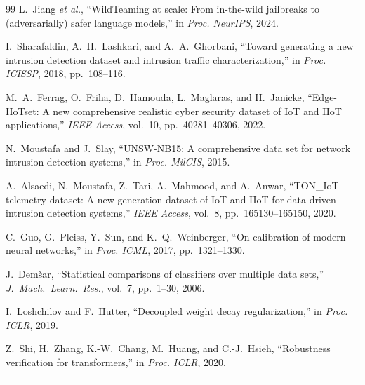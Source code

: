 \documentclass[journal,a4paper,10pt]{IEEEtran}
\theoremstyle{definition}
\theoremstyle{remark}
\begin{document}
\begin{thebibliography}{99}
L.~Jiang \emph{et al.}, ``{WildTeaming} at scale: From in-the-wild jailbreaks to (adversarially) safer language models,'' in \emph{Proc. NeurIPS}, 2024.

I.~Sharafaldin, A.~H.~Lashkari, and A.~A.~Ghorbani, ``Toward generating a new intrusion detection dataset and intrusion traffic characterization,'' in \emph{Proc. ICISSP}, 2018, pp.~108--116.

M.~A.~Ferrag, O.~Friha, D.~Hamouda, L.~Maglaras, and H.~Janicke, ``{Edge-IIoTset}: A new comprehensive realistic cyber security dataset of IoT and IIoT applications,'' \emph{IEEE Access}, vol.~10, pp.~40281--40306, 2022.

N.~Moustafa and J.~Slay, ``{UNSW-NB15}: A comprehensive data set for network intrusion detection systems,'' in \emph{Proc. MilCIS}, 2015.

A.~Alsaedi, N.~Moustafa, Z.~Tari, A.~Mahmood, and A.~Anwar, ``{TON\_IoT} telemetry dataset: A new generation dataset of IoT and IIoT for data-driven intrusion detection systems,'' \emph{IEEE Access}, vol.~8, pp.~165130--165150, 2020.

C.~Guo, G.~Pleiss, Y.~Sun, and K.~Q.~Weinberger, ``On calibration of modern neural networks,'' in \emph{Proc. ICML}, 2017, pp.~1321--1330.

J.~Dem\v{s}ar, ``Statistical comparisons of classifiers over multiple data sets,'' \emph{J.\ Mach.\ Learn.\ Res.}, vol.~7, pp.~1--30, 2006.

I.~Loshchilov and F.~Hutter, ``Decoupled weight decay regularization,'' in \emph{Proc. ICLR}, 2019.


Z.~Shi, H.~Zhang, K.-W.~Chang, M.~Huang, and C.-J.~Hsieh, ``Robustness verification for transformers,'' in \emph{Proc. ICLR}, 2020.

\end{thebibliography}



\vspace{1.5em}
\noindent\rule{\columnwidth}{0.4pt}
\end{document}
